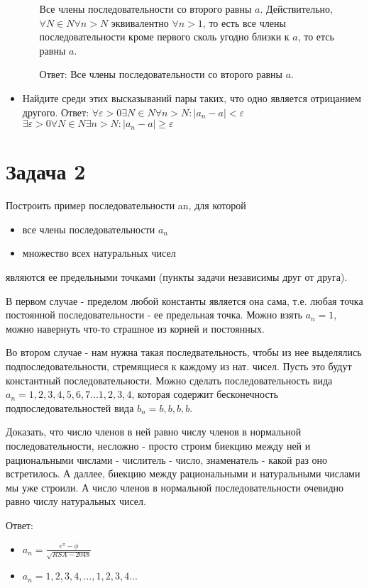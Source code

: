 \documentclass[11pt]{article}
\begin{document}
\begin{itemize}
\begin{itemize}
Все члены последовательности со второго равны $a$. Действительно, $\forall  N \in N \forall  n > N$ эквивалентно $\forall  n>1$, то есть все члены последовательности кроме первого сколь угодно близки к $a$, то етсь равны $a$.

Ответ: Все члены последовательности со второго равны $a$.

\end{itemize}
\item  Найдите среди этих высказываний пары таких, что одно является отрицанием другого.
Ответ: 
$\forall  \varepsilon  > 0 \exists N \in N \forall  n > N : |a_n - a| < \varepsilon $
$\exists \varepsilon  > 0 \forall  N \in N \exists n > N : |a_n - a| \ge \varepsilon $
\end{itemize}

\section{Задача 2}
Построить пример последовательности an, для которой
\begin{itemize}
\item все члены последовательности $a_n$
\item множество всех натуральных чисел
\end{itemize}
являются ее предельными точками (пункты задачи независимы друг от друга).

В первом случае - пределом любой константы является она сама, т.е. любая точка постоянной последовательности - ее предельная точка. Можно взять $a_n=1$, можно навернуть что-то страшное из корней и постоянных.

Во втором случае - нам нужна такая последвательность, чтобы из нее выделялись подпоследовательности, стремящиеся к каждому из нат. чисел. Пусть это будут константный последовательности. Можно сделать последовательность вида $a_n=1,2,3,4,5,6,7 \ldots 1,2,3,4$, которая содержит бесконечность подпоследовательностей вида $b_n=b,b,b,b$.

Доказать, что число членов в ней равно числу членов в нормальной последовательности, несложно - просто строим биекцию между ней и рациональными числами - числитель - число, знаменатель - какой раз оно встретилось. А даллее, биекцию между рациональными и натуральными числами мы уже строили. А число членов в нормальной последовательности очевидно равно числу натуральных чисел.  

Ответ:
\begin{itemize}
\item $a_n = \frac{e^{\pi}-\phi}{\sqrt{RSA-2048}}$
\item $a_n = {1,2,3,4, \ldots,1,2,3,4...}$
\end{itemize}
\end{document}
